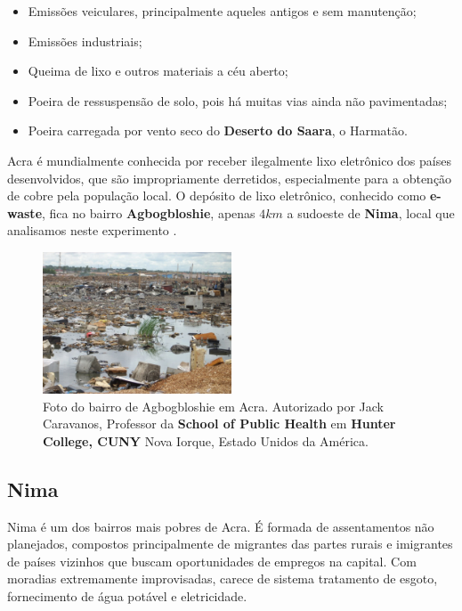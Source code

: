 \begin{itemize}
 \item Emissões veiculares, principalmente aqueles antigos e sem 
       manutenção;
 \item Emissões industriais;
 \item Queima de lixo e outros materiais a céu aberto;
 \item Poeira de ressuspensão de solo, pois há muitas vias ainda não pavimentadas;
 \item Poeira carregada por vento seco do \textbf{Deserto do Saara}, o Harmatão.
\end{itemize}

Acra é mundialmente conhecida por receber ilegalmente lixo 
eletrônico dos países desenvolvidos, que são impropriamente derretidos, especialmente para a obtenção de cobre pela população local. 
O depósito de lixo eletrônico, conhecido como \textbf{e-waste}, 
fica no bairro \textbf{Agbogbloshie}, apenas $4 km$ a sudoeste de \textbf{Nima}, local que analisamos neste experimento
\citep{asampong2015}.

\begin{figure}[H]
  \centering
  \includegraphics[width=0.5\textwidth]{../inputs/images/ewaste_jack_caravano.jpg}
  \caption{Foto do bairro de Agbogbloshie em Acra. Autorizado por Jack Caravanos, 
           Professor da \textbf{School of Public Health} em \textbf{Hunter College, CUNY}
           Nova Iorque, Estado Unidos da América. \label{fig:ewaste}}
\end{figure}

\subsection{Nima}

Nima é um dos bairros mais pobres de Acra. É formada de assentamentos não 
planejados, compostos principalmente de migrantes das partes rurais e 
imigrantes de países vizinhos que buscam oportunidades de empregos na capital. 
Com moradias extremamente improvisadas, carece de sistema tratamento de esgoto, 
fornecimento de água potável e eletricidade. 

